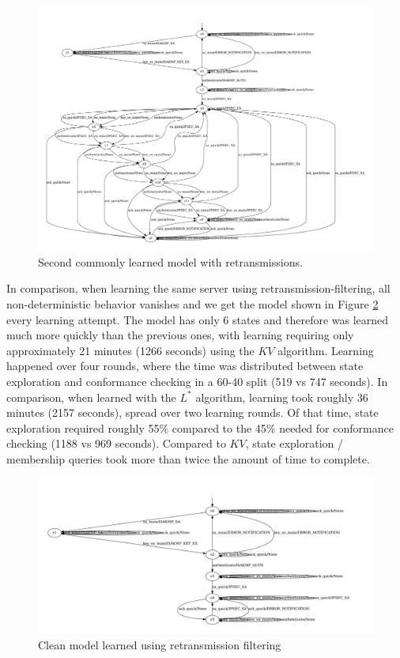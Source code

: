 \begin{figure}[hb]
	\centering
	\includegraphics[width=\linewidth]{images/models/retransmissions/retrans_case2}
	\caption{Second commonly learned model with retransmissions.}
	\label{fig:ret_case2}
\end{figure}

In comparison, when learning the same server using retransmission-filtering, all non-deterministic behavior vanishes and we get the model shown in Figure \ref{fig:reference} every learning attempt. The model has only 6 states and therefore was learned much more quickly than the previous ones, with learning requiring only approximately 21 minutes (1266 seconds) using the $KV$ algorithm. Learning happened over four rounds, where the time was distributed between state exploration and conformance checking in a 60-40 split (519 vs 747 seconds). In comparison, when learned with the $L^*$ algorithm, learning took roughly 36 minutes (2157 seconds), spread over two learning rounds. Of that time, state exploration required roughly 55\% compared to the 45\% needed for conformance checking (1188 vs 969 seconds). Compared to $KV$, state exploration / membership queries took more than twice the amount of time to complete.

\begin{figure}[h]
	\centering
	\includegraphics[width=\linewidth]{images/models/Reference}
	\caption{Clean model learned using retransmission filtering}
	\label{fig:reference}
\end{figure} 


